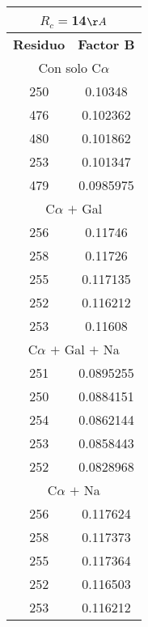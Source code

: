 \begin{tabular}[c]{|c|c|}
\multicolumn{2}{c}{$R_c=$14$\AA$}\\\hline
\textbf{Residuo}&\textbf{Factor B}\\\hline
\multicolumn{2}{c}{Con solo C$\alpha$}\\\hline
       250&   0.10348\\
       476&  0.102362\\
       480&  0.101862\\
       253&  0.101347\\
       479& 0.0985975\\\hline
\multicolumn{2}{c}{C$\alpha$ $+$ Gal}\\\hline
       256&   0.11746\\
       258&   0.11726\\
       255&  0.117135\\
       252&  0.116212\\
       253&   0.11608\\\hline
\multicolumn{2}{c}{C$\alpha$ $+$ Gal $+$ Na}\\\hline
       251& 0.0895255\\
       250& 0.0884151\\
       254& 0.0862144\\
       253& 0.0858443\\
       252& 0.0828968\\\hline
\multicolumn{2}{c}{C$\alpha$ $+$ Na}\\\hline
       256&  0.117624\\
       258&  0.117373\\
       255&  0.117364\\
       252&  0.116503\\
       253&  0.116212\\\hline
\end{tabular}
